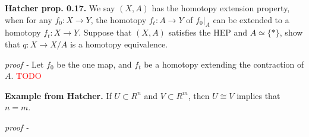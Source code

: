 \documentclass[11pt]{article}
\theoremstyle{definition}
\newcommand{\set}[1]{\{#1\}}
\begin{document}

    \textbf{Hatcher prop. 0.17.} We say \((X,A)\) has the homotopy extension property, when for any \(f_0 : X \to Y\), the homotopy \(f_t : A \to Y\) of \(f_0\vert_A\) can be extended to a homotopy \(f_t: X \to Y\). Suppose that \((X,A)\) satisfies the HEP and \(A \simeq \set{*}\), show that \(q: X \to X/A\) is a homotopy equivalence. 
    
    \emph{proof - } Let \(f_0\) be the one map, and \(f_t\) be a homotopy extending the contraction of \(A\). \textcolor{red}{TODO}


    \textbf{Example from Hatcher.} If \(U \subset R^n\) and \(V \subset R^m\), then \(U \cong V\) implies that \(n = m\).

    \emph{proof - }
    

\end{document}
